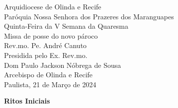 \documentclass{book}
\begin{document}
\begin{center}
    \LARGE Arquidiocese de Olinda e Recife
    \vspace{.2cm} \\
    \Large Paróquia Nossa Senhora dos Prazeres dos Maranguapes
    \vspace{5cm} \\
    \textcolor{VioletRed2}{\huge Quinta-Feira da V Semana da Quaresma}
    \vspace{5cm} \\
    \Large Missa de posse do novo pároco \\ Rev.mo. Pe. André Canuto
    \vspace{.5cm} \\
    \Large Presidida pelo Ex. Rev.mo.
    \vspace{.2cm} \\
    \textcolor{VioletRed2}{\huge Dom Paulo Jackson Nóbrega de Sousa}
    \vspace{.2cm} \\
    \Large Arcebispo de Olinda e Recife
    \vspace{\fill}\\
    \Large Paulista, 21 de Março de 2024
\end{center}
\cleardoublepage{}
\begin{center}
    \textbf{Ritos Iniciais}
\end{center}
\end{document}
